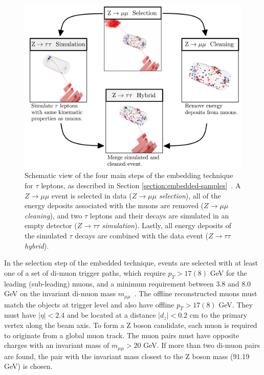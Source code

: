\begin{figure}[ht]
    \centering
    \includegraphics[width=13cm]{figures/ch-4-datasets-monte-carlo/embedded_schematic}
    \caption[Schematic view of the four main steps of the embedding technique for $\tau$ leptons.]{Schematic view of the four main steps of the embedding technique for $\tau$ leptons, as described in Section \ref{section:embedded-samples}~\cite{CMS-TAU-18-001}. A $Z \rightarrow \mu\mu$ event is selected in data (\textit{$Z\rightarrow \mu\mu$ selection}), all of the energy deposits associated with the muons are removed (\textit{$Z \rightarrow \mu\mu$ cleaning}), and two $\tau$ leptons and their decays are simulated in an empty detector (\textit{$Z \rightarrow \tau\tau$ simulation}). Lastly, all energy deposits of the simulated $\tau$ decays are combined with the data event (\textit{$Z \rightarrow \tau\tau$ hybrid}).} 
    \label{fig:embedded-schematic}
\end{figure}

In the selection step of the embedded technique, events are selected with at least one of a set of di-muon trigger paths, which require $p_{T} > 17 (8)$ GeV for the leading (sub-leading) muons, and a minimum requirement between 3.8 and 8.0 GeV on the invariant di-muon mass $m_{\mu\mu}$~\cite{CMS-TAU-18-001}. The offline reconstructed muons must match the objects at trigger level and also have offline $p_{T} > 17 (8)$ GeV. They must have $|\eta| < 2.4$ and be located at a  distance $|d_z| < 0.2$ cm to the primary vertex along the beam axis. To form a Z boson candidate, each muon is required to originate from a global muon track. The muon pairs must have opposite charges with an invariant mass of $m_{\mu\mu} > 20$ GeV. If more than two di-muon pairs are found, the pair with the invariant mass closest to the Z boson mass (91.19 GeV) is chosen. 

